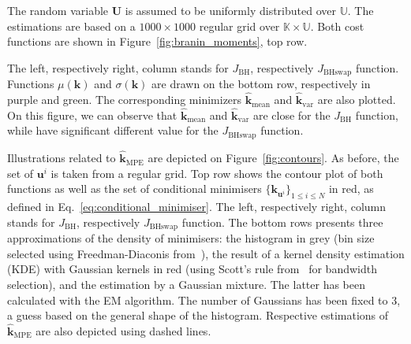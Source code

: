 \documentclass[preprint, 1p]{elsarticle}
\newcommand{\kmean}{{\mathbf{k}}_{\mathrm{mean}}}
\newcommand{\hatkmean}{\hat{\mathbf{k}}_{\mathrm{mean}}}
\newcommand{\kvar}{{\mathbf{k}}_{\mathrm{var}}}
\newcommand{\hatkvar}{\hat{\mathbf{k}}_{\mathrm{var}}}
\newcommand{\hatkmpe}{\hat{\mathbf{k}}_{\mathrm{MPE}}}
\newcommand{\Kspace}{\mathbb{K}}
\newcommand{\Uspace}{\mathbb{U}}
\begin{document}
The random variable $\mathbf{U}$ is assumed to be uniformly distributed over $\Uspace$.
The estimations are %
based on a $1000 \times 1000$ regular grid over $\Kspace\times\Uspace$. Both cost functions are shown in  Figure~\ref{fig:branin_moments}, top row.


 The left, respectively right, column stands for $J_{\mathrm{BH}}$, respectively $J_{\mathrm{BHswap}}$ function. Functions $\mu(\mathbf{k})$ and $\sigma(\mathbf{k})$ are drawn on the bottom row, respectively in purple and green. The corresponding minimizers $\hatkmean$ and $\hatkvar$ are also plotted.
On this figure, we can observe that $\hatkmean$ and $\hatkvar$ are close for the $J_{\mathrm{BH}}$ function, while have significant different value for the $J_{\mathrm{BHswap}}$ function.


Illustrations related to $\hatkmpe$ are depicted on Figure~\ref{fig:contours}. As before, the set of $\mathbf{u}^i$ is taken from a regular grid. Top row shows the contour plot of both functions as well as the set of conditional minimisers $\{\mathbf{k}_{\mathbf{u}^i}\}_{1\leq i \leq N}$ in red, as defined in Eq.~\eqref{eq:conditional_minimiser}.
The left, respectively right, column stands for $J_{\mathrm{BH}}$, respectively $J_{\mathrm{BHswap}}$ function. The bottom rows presents three approximations of the density of minimisers: the histogram in grey (bin size selected using Freedman-Diaconis from~\cite{freedman_histogram_1981}), the result of a kernel density estimation (KDE) with Gaussian kernels in red (using Scott's rule from~\cite{scott_optimal_1979} for bandwidth selection), and the estimation by a Gaussian mixture. The latter has been calculated with the EM algorithm. The number of Gaussians has been fixed to 3, a guess based on the general shape of the histogram. Respective estimations of $\hatkmpe$ are also depicted using dashed lines. 

\end{document}

